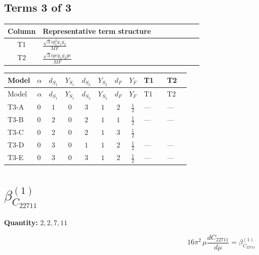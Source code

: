 \documentclass[8pt]{article}
\begin{document}
\begin{landscape}
\subsection*{Terms 3 of 3}
\begin{center}
\begin{tabular}{@{}c >{\raggedright\arraybackslash}p{0.82\linewidth}@{}}
\toprule
Column & Representative term structure \\
\midrule
T1 & \(\displaystyle \frac{\sqrt{3} i g_{1}^{2} \overline{y_{1}} \overline{y_{2}}}{MF}\) \\
\midrule
T2 & \(\displaystyle \frac{\sqrt{3} i ye \overline{y_{1}} \overline{y_{2}} \overline{ye}}{MF}\) \\
\midrule
\bottomrule
\end{tabular}
\end{center}
\smallskip
\tiny
\begin{longtable}{@{}llcccccc >{\raggedright\arraybackslash}p{0.21\linewidth} >{\raggedright\arraybackslash}p{0.21\linewidth}@{}}
\toprule
Model & $\alpha$ & $d_{S_1}$ & $Y_{S_1}$ & $d_{S_2}$ & $Y_{S_2}$ & $d_F$ & $Y_F$ & T1 & T2 \\
\midrule
\endfirsthead
\toprule
Model & $\alpha$ & $d_{S_1}$ & $Y_{S_1}$ & $d_{S_2}$ & $Y_{S_2}$ & $d_F$ & $Y_F$ & T1 & T2 \\
\midrule
\endhead
T3-A & $0$ & $1$ & $0$ & $3$ & $1$ & $2$ & $\frac{1}{2}$ & --- & --- \\
\midrule
T3-B & $0$ & $2$ & $0$ & $2$ & $1$ & $1$ & $\frac{1}{2}$ & --- & --- \\
\midrule
T3-C & $0$ & $2$ & $0$ & $2$ & $1$ & $3$ & $\frac{1}{2}$ & \scriptsize\adjustbox{max width=\linewidth}{$\begin{gathered} - \frac{\sqrt{3} i g_{1}^{2} \overline{y_{1}} \overline{y_{2}}}{8 MF}\end{gathered}$} & \scriptsize\adjustbox{max width=\linewidth}{$\begin{gathered} \frac{\sqrt{3} i ye \overline{y_{1}} \overline{y_{2}} \overline{ye}}{12 MF}\end{gathered}$} \\
\midrule
T3-D & $0$ & $3$ & $0$ & $1$ & $1$ & $2$ & $\frac{1}{2}$ & --- & --- \\
\midrule
T3-E & $0$ & $3$ & $0$ & $3$ & $1$ & $2$ & $\frac{1}{2}$ & --- & --- \\
\midrule
\bottomrule
\end{longtable}
\clearpage
\section*{$\beta_{C_{22711}}^{(1)}$}
\noindent\textbf{Quantity: }$\mathrm{2,2,7,11}$\par\smallskip
\[16\pi^2\,\mu\frac{d C_{22711}}{d\mu}=\beta_{C_{22711}}^{(1)}\]

\end{landscape}
\end{document}
